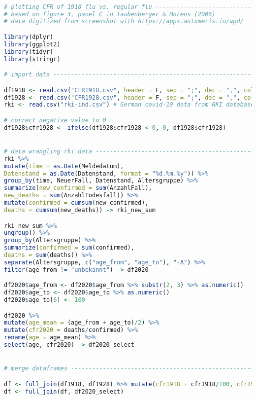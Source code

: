 \begin{lstlisting}[language=R,caption={Data Preparation and Plotting for Figure \ref{fig_cfr}: Case Fatality Rates of Pneumonia and Influenza during the 1918 Flu Pandemic, 1928, and Covid-19 in 2020}, label=lst_cfr]

# plotting CFR of 1918 flu vs. regular flu --------------------------------
# based on figure 3, panel C in Taubenberger & Morens (2006)
# data digitized from screenshot with https://apps.automeris.io/wpd/

library(dplyr)
library(ggplot2)
library(tidyr)
library(stringr)

# import data -------------------------------------------------------------

df1918 <- read.csv("CFR1918.csv", header = F, sep = ";", dec = ",", col.names = c("age", "cfr1918"))
df1928 <- read.csv("CFR1928.csv", header = F, sep = ";", dec = ",", col.names = c("age", "cfr1928"))
rki <- read.csv("rki-ind.csv") # German covid-19 data from RKI database

# correct negative value to 0              
df1928$cfr1928 <- ifelse(df1928$cfr1928 < 0, 0, df1928$cfr1928)


# data wrangling rki data -------------------------------------------------
rki %>% 
mutate(time = as.Date(Meldedatum),
Datenstand = as.Date(Datenstand, format = "%d.%m.%y")) %>% 
group_by(time, NeuerFall, Datenstand, Altersgruppe) %>% 
summarize(new_confirmed = sum(AnzahlFall),
new_deaths = sum(AnzahlTodesfall)) %>%
mutate(confirmed = cumsum(new_confirmed),
deaths = cumsum(new_deaths)) -> rki_new_sum

rki_new_sum %>% 
ungroup() %>% 
group_by(Altersgruppe) %>% 
summarize(confirmed = sum(confirmed),
deaths = sum(deaths)) %>% 
separate(Altersgruppe, c("age_from", "age_to"), "-A") %>% 
filter(age_from != "unbekannt") -> df2020

df2020$age_from <- df2020$age_from %>% substr(2, 3) %>% as.numeric()
df2020$age_to <- df2020$age_to %>% as.numeric()
df2020$age_to[6] <- 100

df2020 %>% 
mutate(age_mean = (age_from + age_to)/2) %>% 
mutate(cfr2020 = deaths/confirmed) %>% 
rename(age = age_mean) %>% 
select(age, cfr2020) -> df2020_select


# merge dataframes --------------------------------------------------------

df <- full_join(df1918, df1928) %>% mutate(cfr1918 = cfr1918/100, cfr1928 = cfr1928/100) 
df <- full_join(df, df2020_select)


\end{lstlisting}
